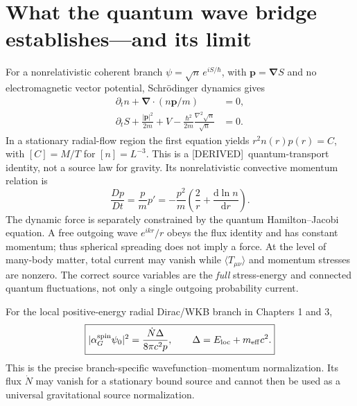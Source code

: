 \documentclass[11pt,a4paper]{article}
\theoremstyle{remark}\newtheorem{remark}[theorem]{Remark}
\newcommand{\dd}{\mathrm d}\newcommand{\Tr}{\operatorname{Tr}}\newcommand{\cO}{\mathcal O}\newcommand{\cG}{\mathcal G}\newcommand{\cH}{\mathcal H}\newcommand{\cE}{\mathcal E}\newcommand{\cK}{\mathcal K}\newcommand{\AX}{\textsf{[AXIOM]}}\newcommand{\D}{\textsf{[DERIVED]}}\newcommand{\C}{\textsf{[CONDITIONAL]}}\newcommand{\OPEN}{\textsf{[OPEN]}}
\begin{document}
\section{What the quantum wave bridge establishes---and its limit}
For a nonrelativistic coherent branch $\psi=\sqrt n\,e^{iS/\hbar}$, with $\bm p=\bm\nabla S$ and no electromagnetic vector potential, Schr\"odinger dynamics gives
\begin{align}
\partial_tn+\bm\nabla\cdot(n\bm p/m)&=0,\\
\partial_t S+\frac{|\bm p|^2}{2m}+V-\frac{\hbar^2}{2m}\frac{\nabla^2\sqrt n}{\sqrt n}&=0.
\end{align}
In a stationary radial-flow region the first equation yields $\boxed{r^2n(r)p(r)=C}$, with $[C]=M/T$ for $[n]=L^{-3}$. This is a \D\ quantum-transport identity, not a source law for gravity. Its nonrelativistic convective momentum relation is
\begin{equation}\label{eq:convective}
\frac{Dp}{Dt}=\frac{p}{m}p'=-\frac{p^2}{m}\left(\frac2r+\frac{\dd\ln n}{\dd r}\right).
\end{equation}
The dynamic force is separately constrained by the quantum Hamilton--Jacobi equation. A free outgoing wave $e^{ikr}/r$ obeys the flux identity and has constant momentum; thus spherical spreading does not imply a force. At the level of many-body matter, total current may vanish while $\langle T_{\mu\nu}\rangle$ and momentum stresses are nonzero. The correct source variables are the \emph{full} stress-energy and connected quantum fluctuations, not only a single outgoing probability current.

For the local positive-energy radial Dirac/WKB branch in Chapters 1 and 3,
\begin{equation}\label{eq:dirac}
 \boxed{|\alpha_G^{\rm spin}\psi_0|^2=\frac{\dot N\Delta}{8\pi c^2p},\qquad
 \Delta=E_{\rm loc}+m_{\rm eff}c^2.}
\end{equation}
This is the precise branch-specific wavefunction--momentum normalization. Its flux $\dot N$ may vanish for a stationary bound source and cannot then be used as a universal gravitational source normalization.
\end{document}
